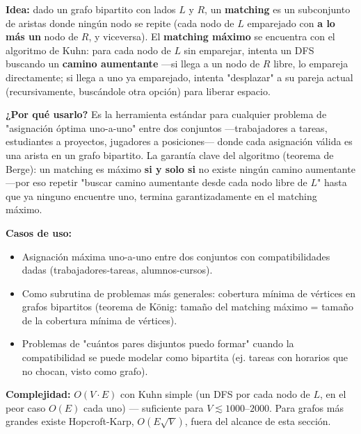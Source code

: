 \documentclass[10pt,a4paper,twocolumn]{article}
\begin{document}
\textbf{Idea:} dado un grafo bipartito con lados $L$ y $R$, un
\textbf{matching} es un subconjunto de aristas donde ningún nodo se
repite (cada nodo de $L$ emparejado con \textbf{a lo más un} nodo de
$R$, y viceversa). El \textbf{matching máximo} se encuentra con el
algoritmo de Kuhn: para cada nodo de $L$ sin emparejar, intenta un
DFS buscando un \textbf{camino aumentante} —si llega a un nodo de $R$
libre, lo empareja directamente; si llega a uno ya emparejado,
intenta "desplazar" a su pareja actual (recursivamente, buscándole
otra opción) para liberar espacio.

\textbf{¿Por qué usarlo?} Es la herramienta estándar para cualquier
problema de "asignación óptima uno-a-uno" entre dos conjuntos
—trabajadores a tareas, estudiantes a proyectos, jugadores a
posiciones— donde cada asignación válida es una arista en un grafo
bipartito. La garantía clave del algoritmo (teorema de Berge): un
matching es máximo \textbf{si y solo si} no existe ningún camino
aumentante —por eso repetir "buscar camino aumentante desde cada nodo
libre de $L$" hasta que ya ninguno encuentre uno, termina
garantizadamente en el matching máximo.

\textbf{Casos de uso:}

\begin{itemize}
	\item Asignación máxima uno-a-uno entre dos conjuntos con
	compatibilidades dadas (trabajadores-tareas, alumnos-cursos).
	\item Como subrutina de problemas más generales: cobertura mínima
	de vértices en grafos bipartitos (teorema de König: tamaño del
	matching máximo = tamaño de la cobertura mínima de vértices).
	\item Problemas de "cuántos pares disjuntos puedo formar" cuando
	la compatibilidad se puede modelar como bipartita (ej. tareas con
	horarios que no chocan, visto como grafo).
\end{itemize}

\textbf{Complejidad:} $O(V \cdot E)$ con Kuhn simple (un DFS por
cada nodo de $L$, en el peor caso $O(E)$ cada uno) — suficiente para
$V \lesssim 1000$–$2000$. Para grafos más grandes existe
Hopcroft-Karp, $O(E\sqrt{V})$, fuera del alcance de esta sección.
\end{document}
